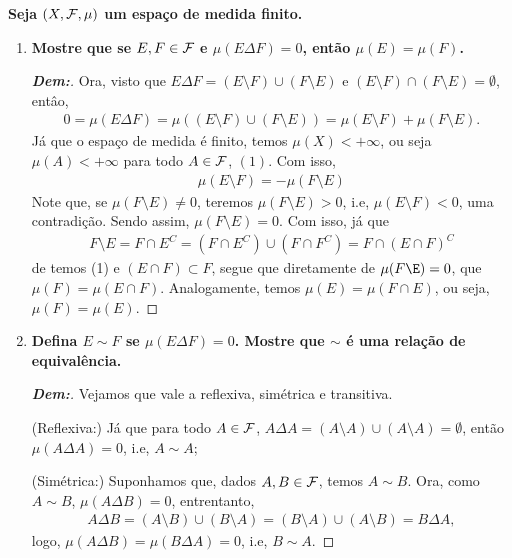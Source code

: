 \newpage 
{}
\myexe{\thedois}
\bigline 
\textbf{Seja $(X, \mathcal F, \mu)$ um espaço de medida finito.} 
\begin{enumerate}[label=(\alph*), wide, labelindent=0pt]
  \item \textbf{Mostre que se $E, F \in \mathcal F$ e $\mu(E \Delta F) = 0$, 
    então $\mu(E) = \mu(F)$.}
    \begin{proof}[\textbf{Dem:}] Ora, visto que 
      $E \Delta F = (E \setminus F) \cup (F \setminus E)$ e 
      $(E\setminus F)\cap (F \setminus E) = \emptyset$, entâo, 
      \begin{align*}
        0 = \mu(E\Delta F) = \mu((E \setminus F) \cup (F \setminus E))
        = \mu(E\setminus F) + \mu(F\setminus E).
      \end{align*}
      Já que o espaço de medida é finito, temos $\mu(X)<+\infty$, ou seja $\mu(A) < +\infty$
      para todo $A \in \mathcal F$, $(1)$. Com isso, 
      \begin{align*}
        \mu(E\setminus F) = -\mu(F\setminus E)
      \end{align*}
      Note que, se $\mu(F\setminus E) \neq 0$, teremos $\mu(F \setminus E) > 0$, i.e, 
      $\mu(E \setminus F) < 0$, uma contradição. Sendo assim, $\mu(F \setminus E) = 0$. 
      Com isso, já que 
      \begin{align*}
        F\setminus E = F \cap E^C = (F \cap E^C) \cup (F \cap F^C) = F\cap(E \cap F)^C
      \end{align*}
      de temos (1) e $(E\cap F) \subset F$, segue que diretamente de $\mu(F\E) = 0$,
      que $\mu(F) = \mu(E \cap F)$. Analogamente, temos $\mu(E) = \mu(F \cap E)$, 
      ou seja, $\mu(F) = \mu(E)$.
  \end{proof}
  \item \textbf{Defina $E\sim F$ se $\mu(E \Delta F) = 0$. Mostre que $\sim$ é uma 
    relação de equivalência.}
    \begin{proof}[\textbf{Dem:}]
      Vejamos que vale a reflexiva, simétrica e transitiva. 
     
      \noindent
      (Reflexiva:) Já que para todo $A \in \mathcal F$, $A \Delta A = (A\setminus A) \cup (A \setminus A) = \emptyset$, 
      então $\mu(A\Delta A) = 0$, i.e, $A \sim A$;
      
      \noindent 
      (Simétrica:) Suponhamos que, dados $A, B \in \mathcal F$, temos $A \sim B$. Ora, como $A \sim B$, 
      $\mu(A\Delta B) = 0$, entrentanto,
      \begin{align*}
        A\Delta B = (A\setminus B) \cup (B \setminus A) = (B \setminus A) \cup (A \setminus B) = B\Delta A,
      \end{align*}
      logo, $\mu(A\Delta B) = \mu(B\Delta A) = 0$, i.e, $B \sim A$.


\end{proof}
\end{enumerate}
